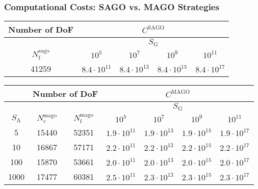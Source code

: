 \begin{frame}
  \frametitle{Computational Costs: SAGO vs. MAGO Strategies}

  \begin{table}
    \centering
    \begin{tabular}{c|cccc}
        \textbf{Number of DoF} & \multicolumn{4}{c}{\( C^{\text{SAGO}} \)} \\
        \midrule \midrule
        & \multicolumn{4}{c}{\( S_{\text{G}} \)} \\
        \toprule
        \( N_{\text{f}}^{\text{sago}} \) & \( 10^5 \) & \( 10^7 \) & \( 10^9 \) & \( 10^{11} \)\\
        \midrule
        41259   &  \( 8.4 \cdot 10^{11} \)   &   \( 8.4 \cdot 10^{13} \)   &   \( 8.4 \cdot 10^{15} \)   &   \( 8.4 \cdot 10^{17} \) \\
        \bottomrule
    \end{tabular}
    \label{tab:helm_sago}
  \end{table}

  \vspace{-0.5em} %

  \begin{table}
    \centering
    \begin{tabular}{c|cc|cccc}
        & \multicolumn{2}{c|}{\textbf{Number of DoF}} & \multicolumn{4}{c}{\( C^{\text{MAGO}} \)} \\
        \midrule \midrule
        & & & \multicolumn{4}{c}{\( S_{\text{G}} \)} \\
        \toprule
        \( S_{\text{A}} \) & \( N_{\text{c}}^{\text{mago}} \) & \( N_{\text{f}}^{\text{mago}} \) & \( 10^5 \) & \( 10^7 \) & \( 10^9 \) & \( 10^{11} \)\\
        \midrule
        5     & 15440 & 52351 & \( 1.9 \cdot 10^{11} \) & \( 1.9 \cdot 10^{13} \) & \( 1.9 \cdot 10^{15} \) & \( 1.9 \cdot 10^{17} \) \\
        10    & 16867 & 57171 & \( 2.2 \cdot 10^{11} \) & \( 2.2 \cdot 10^{13} \) & \( 2.2 \cdot 10^{15} \) & \( 2.2 \cdot 10^{17} \) \\
        100   & 15870 & 53661 & \( 2.0 \cdot 10^{11} \) & \( 2.0 \cdot 10^{13} \) & \( 2.0 \cdot 10^{15} \) & \( 2.0 \cdot 10^{17} \) \\
        1000  & 17477 & 60381 & \( 2.5 \cdot 10^{11} \) & \( 2.3 \cdot 10^{13} \) & \( 2.3 \cdot 10^{15} \) & \( 2.3 \cdot 10^{17} \) \\
        \bottomrule
    \end{tabular}
    \label{tab:helm_mago}
  \end{table}
\end{frame}
